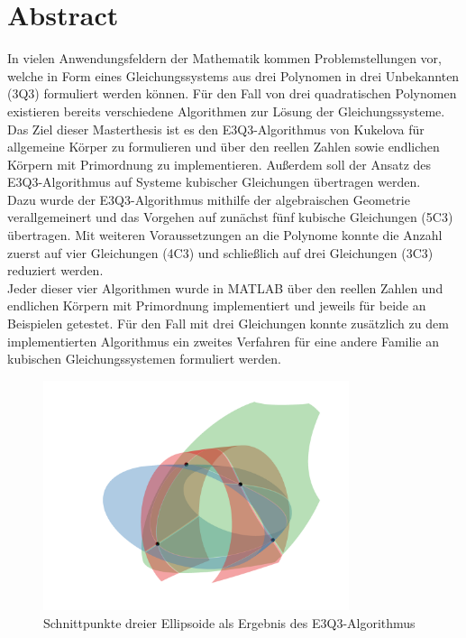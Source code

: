 \documentclass[a4paper,oneside, 11pt, openany%
]{article}
\theoremstyle{custom}
\theoremstyle{custom}
\begin{document}
	\section*{Abstract}
	In vielen Anwendungsfeldern der Mathematik kommen Problemstellungen vor, welche in Form eines Gleichungssystems aus drei Polynomen in drei Unbekannten (3Q3) formuliert werden können. Für den Fall von drei quadratischen Polynomen existieren bereits verschiedene Algorithmen zur Lösung der Gleichungssysteme.\\
	Das Ziel dieser Masterthesis ist es den E3Q3-Algorithmus von Kukelova für allgemeine Körper zu formulieren und über den reellen Zahlen sowie endlichen Körpern mit Primordnung zu implementieren. Außerdem soll der Ansatz des E3Q3-Algorithmus auf Systeme kubischer Gleichungen übertragen werden.\\
	Dazu wurde der E3Q3-Algorithmus mithilfe der algebraischen Geometrie verallgemeinert und das Vorgehen auf zunächst fünf kubische Gleichungen (5C3) übertragen. Mit weiteren Voraussetzungen an die Polynome konnte die Anzahl zuerst auf vier Gleichungen (4C3) und schließlich auf drei Gleichungen (3C3) reduziert werden.\\
	Jeder dieser vier Algorithmen wurde in MATLAB über den reellen Zahlen und endlichen Körpern mit Primordnung implementiert und jeweils für beide an Beispielen getestet. Für den Fall mit drei Gleichungen konnte zusätzlich zu dem implementierten Algorithmus ein zweites Verfahren für eine andere Familie an kubischen Gleichungssystemen formuliert werden.
	\begin{figure}[H]
		\includegraphics[width=0.8\textwidth]{"images/e3q3_example1_zoom.png"}
		\caption*{Schnittpunkte dreier Ellipsoide als Ergebnis des E3Q3-Algorithmus}
	\end{figure}
	\newpage
	\setcounter{tocdepth}{3}
	\tableofcontents
	\newpage
	\setcounter{tocdepth}{2}
	\listoffigures
	\newpage
\end{document}
